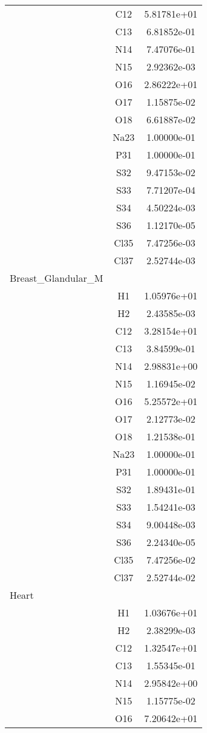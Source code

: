 \begin{centering}
\begin{longtable}{l c c}
& C12 & 5.81781e+01 \\ 
& C13 & 6.81852e-01 \\ 
& N14 & 7.47076e-01 \\ 
& N15 & 2.92362e-03 \\ 
& O16 & 2.86222e+01 \\ 
& O17 & 1.15875e-02 \\ 
& O18 & 6.61887e-02 \\ 
& Na23 & 1.00000e-01 \\ 
& P31 & 1.00000e-01 \\ 
& S32 & 9.47153e-02 \\ 
& S33 & 7.71207e-04 \\ 
& S34 & 4.50224e-03 \\ 
& S36 & 1.12170e-05 \\ 
& Cl35 & 7.47256e-03 \\ 
& Cl37 & 2.52744e-03 \\ 
\hline
Breast_Glandular_M & & \\
\hline
& H1 & 1.05976e+01 \\ 
& H2 & 2.43585e-03 \\ 
& C12 & 3.28154e+01 \\ 
& C13 & 3.84599e-01 \\ 
& N14 & 2.98831e+00 \\ 
& N15 & 1.16945e-02 \\ 
& O16 & 5.25572e+01 \\ 
& O17 & 2.12773e-02 \\ 
& O18 & 1.21538e-01 \\ 
& Na23 & 1.00000e-01 \\ 
& P31 & 1.00000e-01 \\ 
& S32 & 1.89431e-01 \\ 
& S33 & 1.54241e-03 \\ 
& S34 & 9.00448e-03 \\ 
& S36 & 2.24340e-05 \\ 
& Cl35 & 7.47256e-02 \\ 
& Cl37 & 2.52744e-02 \\ 
\hline
Heart & & \\
\hline
& H1 & 1.03676e+01 \\ 
& H2 & 2.38299e-03 \\ 
& C12 & 1.32547e+01 \\ 
& C13 & 1.55345e-01 \\ 
& N14 & 2.95842e+00 \\ 
& N15 & 1.15775e-02 \\ 
& O16 & 7.20642e+01 \\ 

\end{longtable}
\end{centering}
